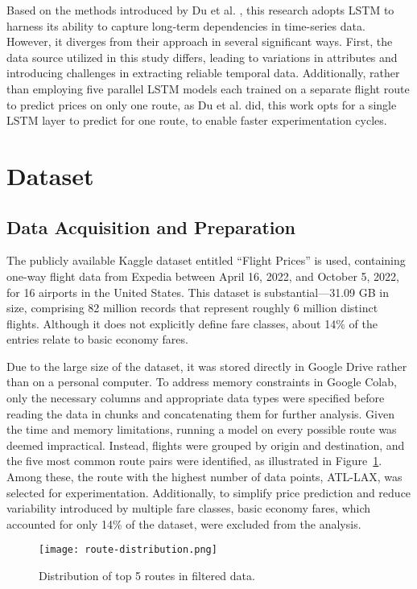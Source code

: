 \documentclass[conference]{IEEEtran}
\begin{document}
Based on the methods introduced by Du et al. \cite{b11}, this research adopts LSTM to harness its ability to capture long-term dependencies in time-series data. However, it diverges from their approach in several significant ways. First, the data source utilized in this study differs, leading to variations in attributes and introducing challenges in extracting reliable temporal data. Additionally, rather than employing five parallel LSTM models each trained on a separate flight route to predict prices on only one route, as Du et al. \cite{b11} did, this work opts for a single LSTM layer to predict for one route, to enable faster experimentation cycles.


\section{Dataset}
\subsection{Data Acquisition and Preparation}\label{3a}
The publicly available Kaggle dataset entitled “Flight Prices” \cite{b12} is used, containing one-way flight data from Expedia between April 16, 2022, and October 5, 2022, for 16 airports in the United States. This dataset is substantial—31.09 GB in size, comprising 82 million records that represent roughly 6 million distinct flights. Although it does not explicitly define fare classes, about 14\% of the entries relate to basic economy fares.

Due to the large size of the dataset, it was stored directly in Google Drive rather than on a personal computer. To address memory constraints in Google Colab, only the necessary columns and appropriate data types were specified before reading the data in chunks and concatenating them for further analysis. Given the time and memory limitations, running a model on every possible route was deemed impractical. Instead, flights were grouped by origin and destination, and the five most common route pairs were identified, as illustrated in Figure~\ref{fig:route-distribution}. Among these, the route with the highest number of data points, ATL-LAX, was selected for experimentation. Additionally, to simplify price prediction and reduce variability introduced by multiple fare classes, basic economy fares, which accounted for only 14\% of the dataset, were excluded from the analysis.


\begin{figure}[htbp]
\centerline{\texttt{[image: route-distribution.png]}}
\caption{Distribution of top 5 routes in filtered data.}
\label{fig:route-distribution}
\end{figure}
\end{document}
